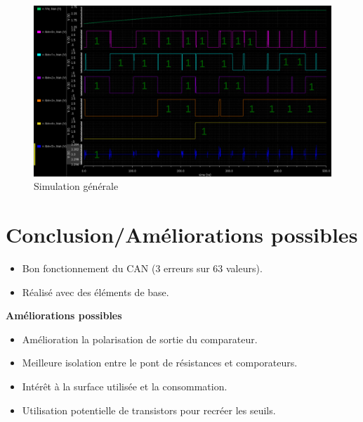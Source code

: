 \documentclass{beamer}
\begin{document}
\begin{frame}

\begin{figure}[!htb]
  \includegraphics[width=\linewidth]{sim_general.png}
  \caption{Simulation g\'en\'erale}
\end{figure}

\end{frame}


\section{Conclusion/Am\'eliorations possibles}

\begin{frame}

\begin{itemize}
    \item Bon fonctionnement du CAN (3 erreurs sur 63 valeurs).
    \item R\'ealis\'e avec des \'el\'ements de base.
\end{itemize}

\medskip

\textbf{Am\'eliorations possibles}
\begin{itemize}
  \item Am\'elioration la polarisation de sortie du comparateur.
  \item Meilleure isolation entre le pont de r\'esistances et comporateurs.
  \item Int\'er\^et \`a la surface utilis\'ee et la consommation.
  \item Utilisation potentielle de transistors pour recr\'eer les seuils.
\end{itemize}


\end{frame}

\end{document}
